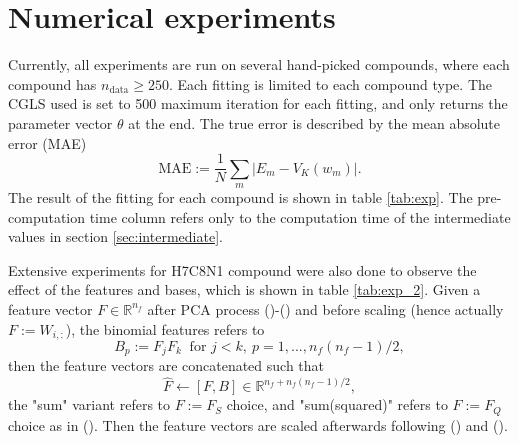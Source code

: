 \documentclass[12pt]{article}
\begin{document}
\section{Numerical experiments}
Currently, all experiments are run on several hand-picked compounds, where each compound has $n_\text{data} \geq 250$. 
Each fitting is limited to each compound type. The CGLS used is set to 500 maximum iteration for each fitting, and only returns the parameter vector $\theta$ at the end.
The true error is described by the mean absolute error (MAE)
\begin{equation}
	\text{MAE} := \frac{1}{N}\sum_m|E_{m} - V_K(w_m)|.
\end{equation}
The result of the fitting for each compound is shown in table \ref{tab:exp}. The pre-computation time column refers only to the computation time of the intermediate values in section \ref{sec:intermediate}. 

Extensive experiments for H7C8N1 compound were also done to observe the effect of the features and bases, which is shown in table \ref{tab:exp_2}. Given a feature vector $F \in \mathbb{R}^{n_f} $ after PCA process ()-() and before scaling (hence actually $F:=W_{i,:}$), the binomial features refers to
\begin{equation}
	B_{p} := F_{j}F_{k} ~ \text{ for } j<k, ~ p = 1,...,n_f(n_f-1)/2,
\end{equation}
then the feature vectors are concatenated such that
\begin{equation}
	\hat{F} \leftarrow [F, B] \in \mathbb{R}^{n_f+n_f(n_f-1)/2},
\end{equation}
the "sum" variant refers to $F := F_S$ choice, and "sum(squared)" refers to $F := F_Q$ choice as in (). Then the feature vectors are scaled afterwards following () and ().
\end{document}
